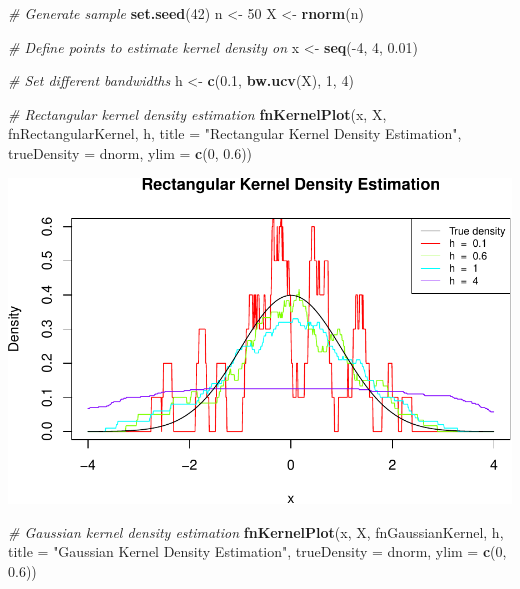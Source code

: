 \documentclass[10pt,]{article}
\newenvironment{Shaded}{\begin{snugshade}}{\end{snugshade}}
\newcommand{\KeywordTok}[1]{\textcolor[rgb]{0.13,0.29,0.53}{\textbf{{#1}}}}
\newcommand{\DataTypeTok}[1]{\textcolor[rgb]{0.13,0.29,0.53}{{#1}}}
\newcommand{\DecValTok}[1]{\textcolor[rgb]{0.00,0.00,0.81}{{#1}}}
\newcommand{\FloatTok}[1]{\textcolor[rgb]{0.00,0.00,0.81}{{#1}}}
\newcommand{\StringTok}[1]{\textcolor[rgb]{0.31,0.60,0.02}{{#1}}}
\newcommand{\CommentTok}[1]{\textcolor[rgb]{0.56,0.35,0.01}{\textit{{#1}}}}
\newcommand{\NormalTok}[1]{{#1}}
\begin{document}
\begin{Shaded}
\begin{Highlighting}[]
\CommentTok{# Generate sample}
\KeywordTok{set.seed}\NormalTok{(}\DecValTok{42}\NormalTok{)}
\NormalTok{n <-}\StringTok{ }\DecValTok{50}
\NormalTok{X <-}\StringTok{ }\KeywordTok{rnorm}\NormalTok{(n)}

\CommentTok{# Define points to estimate kernel density on}
\NormalTok{x <-}\StringTok{ }\KeywordTok{seq}\NormalTok{(-}\DecValTok{4}\NormalTok{, }\DecValTok{4}\NormalTok{, }\FloatTok{0.01}\NormalTok{)}

\CommentTok{# Set different bandwidths}
\NormalTok{h <-}\StringTok{ }\KeywordTok{c}\NormalTok{(}\FloatTok{0.1}\NormalTok{, }\KeywordTok{bw.ucv}\NormalTok{(X), }\DecValTok{1}\NormalTok{, }\DecValTok{4}\NormalTok{)}

\CommentTok{# Rectangular kernel density estimation}
\KeywordTok{fnKernelPlot}\NormalTok{(x, X, fnRectangularKernel, h, }
             \DataTypeTok{title =} \StringTok{"Rectangular Kernel Density Estimation"}\NormalTok{,}
             \DataTypeTok{trueDensity =} \NormalTok{dnorm, }\DataTypeTok{ylim =} \KeywordTok{c}\NormalTok{(}\DecValTok{0}\NormalTok{, }\FloatTok{0.6}\NormalTok{))}
\end{Highlighting}
\end{Shaded}

\includegraphics{project2_files/figure-latex/Kernel density estimation for standard normal-1.pdf}

\begin{Shaded}
\begin{Highlighting}[]
\CommentTok{# Gaussian kernel density estimation}
\KeywordTok{fnKernelPlot}\NormalTok{(x, X, fnGaussianKernel, h, }
             \DataTypeTok{title =} \StringTok{"Gaussian Kernel Density Estimation"}\NormalTok{,}
             \DataTypeTok{trueDensity =} \NormalTok{dnorm, }\DataTypeTok{ylim =} \KeywordTok{c}\NormalTok{(}\DecValTok{0}\NormalTok{, }\FloatTok{0.6}\NormalTok{))}
\end{Highlighting}
\end{Shaded}
\end{document}
